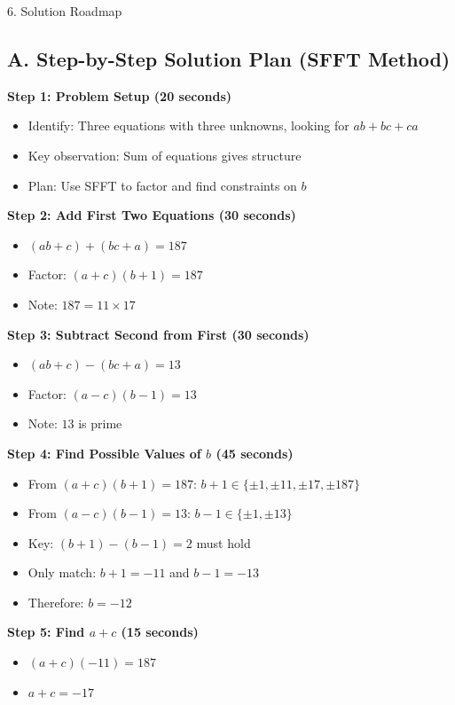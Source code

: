 \documentclass[12pt]{article}
\begin{document}
\begin{roadmapbox}{6. Solution Roadmap}

\subsection*{A. Step-by-Step Solution Plan (SFFT Method)}

\textbf{Step 1: Problem Setup (20 seconds)}
\begin{itemize}
    \item Identify: Three equations with three unknowns, looking for $ab + bc + ca$
    \item Key observation: Sum of equations gives structure
    \item Plan: Use SFFT to factor and find constraints on $b$
\end{itemize}

\textbf{Step 2: Add First Two Equations (30 seconds)}
\begin{itemize}
    \item $(ab + c) + (bc + a) = 187$
    \item Factor: $(a+c)(b+1) = 187$
    \item Note: $187 = 11 \times 17$
\end{itemize}

\textbf{Step 3: Subtract Second from First (30 seconds)}
\begin{itemize}
    \item $(ab + c) - (bc + a) = 13$
    \item Factor: $(a-c)(b-1) = 13$
    \item Note: $13$ is prime
\end{itemize}

\textbf{Step 4: Find Possible Values of $b$ (45 seconds)}
\begin{itemize}
    \item From $(a+c)(b+1) = 187$: $b+1 \in \{\pm 1, \pm 11, \pm 17, \pm 187\}$
    \item From $(a-c)(b-1) = 13$: $b-1 \in \{\pm 1, \pm 13\}$
    \item Key: $(b+1) - (b-1) = 2$ must hold
    \item Only match: $b+1 = -11$ and $b-1 = -13$
    \item Therefore: $b = -12$
\end{itemize}

\textbf{Step 5: Find $a+c$ (15 seconds)}
\begin{itemize}
    \item $(a+c)(-11) = 187$
    \item $a + c = -17$
\end{itemize}


\end{roadmapbox}
\end{document}
